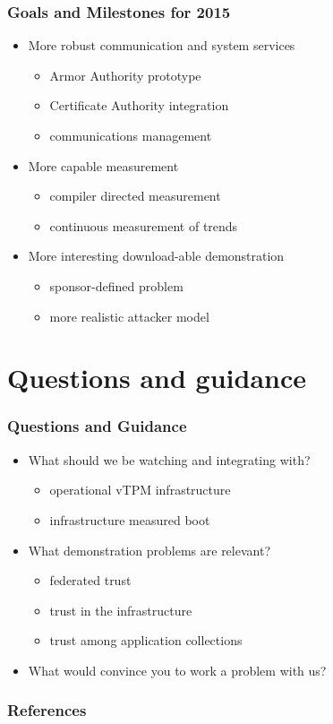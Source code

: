 \documentclass{beamer}
\begin{document}
\begin{frame}
  \frametitle{Goals and Milestones for 2015}

  \begin{itemize}
  \item More robust communication and system services
    \begin{itemize}
    \item Armor Authority prototype
    \item Certificate Authority integration
    \item communications management
    \end{itemize}
  \item More capable measurement
    \begin{itemize}
    \item compiler directed measurement
    \item continuous measurement of trends
    \end{itemize}
  \item More interesting download-able demonstration
    \begin{itemize}
    \item sponsor-defined problem
    \item more realistic attacker model
    \end{itemize}
  \end{itemize}
\end{frame}

\section{Questions and guidance}

\begin{frame}
  \frametitle{Questions and Guidance}

  \begin{itemize}
  \item What should we be watching and integrating with?
    \begin{itemize}
    \item operational vTPM infrastructure
    \item infrastructure measured boot
    \end{itemize}
  \item What demonstration problems are relevant?
    \begin{itemize}
    \item federated trust
    \item trust in the infrastructure
    \item trust among application collections
    \end{itemize}
  \item What would convince you to work a problem with us?
  \end{itemize}
\end{frame}

\nocite{Coker::Principles-of-R,Haldar:04:Semantic-Remote,Fabrega:1999aa}

\begin{frame}
  \frametitle{References}
  
\end{frame}
\end{document}
